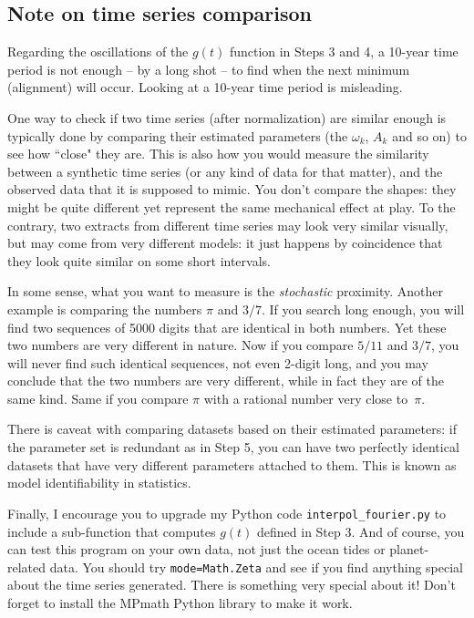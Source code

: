 \documentclass[oneside,10pt]{book}
\begin{document}
\subsection{Note on time series comparison}

 Regarding the oscillations of the $g(t)$ function in Steps 3 and 4, a 10-year time period is not enough -- by a long shot -- to find when the next minimum (alignment) will occur. Looking at a 10-year time period is misleading.

One way to check if two time series (after \textcolor{index}{normalization}) are similar enough is typically done by comparing their estimated parameters (the $\omega_k$, $A_k$ and so on) to see how ``close" they are. This is also how you would measure the similarity between a synthetic time series (or any kind of data for that matter), and the observed data that it is supposed to mimic. You don't compare the shapes: they might be quite different yet represent the same mechanical effect at play. To the contrary, two extracts from different time series may look very similar visually, but may come from very different models: it just happens by coincidence that they look quite similar on some short intervals. 

In some sense, what you want to measure is the {\em stochastic} proximity. Another example is comparing the numbers $\pi$ and $3/7$. If you search long enough, you will find two sequences of \num{5000} digits that are identical in both numbers. Yet these two numbers are very different in nature. Now if you compare $5/11$ and $3/7$, you will never find such identical sequences, not even 2-digit long, and you may conclude that the two numbers are very different, while in fact they are of the same kind. Same if you compare $\pi$ with a rational number very close to~$\pi$.

There is caveat with comparing datasets based on their estimated parameters: if the parameter set is redundant as in Step 5, you can have two perfectly identical datasets that have very different parameters attached to them. This is known as \textcolor{index}{model identifiability} in statistics. 

Finally, I encourage you to upgrade my Python code \texttt{interpol\_fourier.py} to include a sub-function that computes $g(t)$ defined in Step 3. And of course, you can test this program on your own data, not just the ocean tides or planet-related data. You should try \texttt{\textquotesingle mode=Math.Zeta\textquotesingle} and see if you find anything special about the time series generated. There is something very special about it! Don't forget to install the MPmath Python library to make it work.
\end{document}
